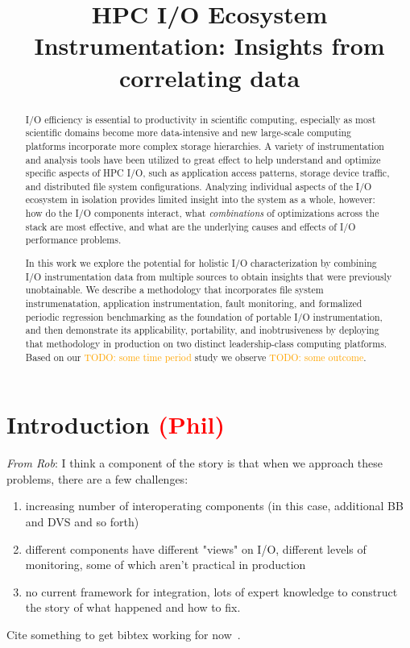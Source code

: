 \documentclass[conference,10pt,compsocconf]{IEEEtran}
\newcommand{\assign}[1]{\textcolor{red}{(#1)}}
\newcommand{\todo}[1]{\textcolor{Orange}{TODO: #1}}
\begin{document}
\title{HPC I/O Ecosystem Instrumentation: Insights from correlating data}

\maketitle

\begin{abstract}

I/O efficiency is essential to productivity in scientific computing,
especially as most scientific domains become more data-intensive and
new large-scale computing platforms incorporate more complex storage
hierarchies.  A variety of instrumentation and analysis tools have been
utilized to great effect to help understand and optimize specific aspects of
HPC I/O, such as application access patterns, storage device traffic, and
distributed file system configurations.  Analyzing individual aspects of
the I/O ecosystem in isolation provides limited insight into the system as a
whole, however: how do the I/O components interact, what \emph{combinations}
of optimizations across the stack are most effective, and what are the
underlying causes and effects of I/O performance problems.

In this work we explore the potential for holistic I/O characterization
by combining I/O instrumentation data from multiple sources to obtain
insights that were previously unobtainable. We describe a methodology that
incorporates file system instrumenatation, application instrumentation,
fault monitoring, and formalized periodic regression benchmarking as
the foundation of portable I/O instrumentation, and then demonstrate
its applicability, portability, and inobtrusiveness by deploying that
methodology in production on two distinct leadership-class computing
platforms. Based on our \todo{some time period} study we observe
\todo{some outcome}.

\end{abstract}

\section{Introduction \assign{Phil}}

\emph{From Rob}: I think a component of the story is that when we approach these problems, there are a few challenges:
\begin{enumerate}
\item increasing number of interoperating components (in this case, additional
BB and DVS and so forth)
\item different components have different "views" on I/O, different levels of
monitoring, some of which aren't practical in production
\item no current framework for integration, lots of expert knowledge to
construct the story of what happened and how to fix.
\end{enumerate}
Cite something to get bibtex working for now~\cite{carns200924}.
\end{document}
